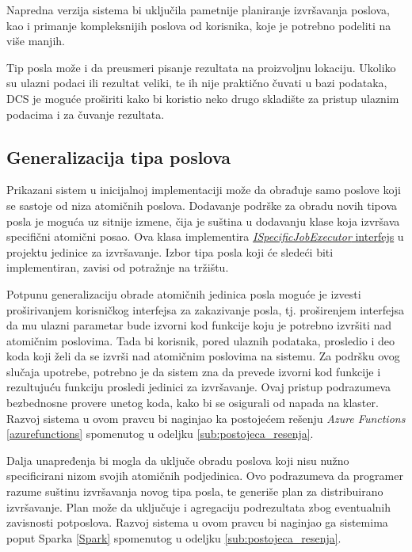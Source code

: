 \documentclass[12pt,oneside]{memoir}
\begin{document}
Napredna verzija sistema bi uključila pametnije planiranje izvršavanja poslova, kao i primanje kompleksnijih poslova od korisnika, koje je potrebno podeliti na više manjih.

Tip posla može i da preusmeri pisanje rezultata na proizvoljnu lokaciju.
Ukoliko su ulazni podaci ili rezultat veliki, te ih nije praktično čuvati u bazi podataka, DCS je moguće proširiti kako bi koristio neko drugo skladište za pristup ulaznim podacima i za čuvanje rezultata.


\subsection{Generalizacija tipa poslova}

Prikazani sistem u inicijalnoj implementaciji može da obrađuje samo poslove koji se sastoje od niza atomičnih poslova. Dodavanje podrške za obradu novih tipova posla je moguća uz sitnije izmene, čija je suština u dodavanju klase koja izvršava specifični atomični posao. Ova klasa implementira \href{https://github.com/milana-kovacevic/DistributedComputationSystem/blob/main/src/ComputeNode/Executors/ISpecificJobExecutor.cs}{\emph{ISpecificJobExecutor} interfejs} u projektu jedinice za izvršavanje. Izbor tipa posla koji će sledeći biti implementiran, zavisi od potražnje na tržištu.

Potpunu generalizaciju obrade atomičnih jedinica posla moguće je izvesti proširivanjem korisničkog interfejsa za zakazivanje posla, tj. proširenjem interfejsa da mu ulazni parametar bude izvorni kod funkcije koju je potrebno izvršiti nad atomičnim poslovima. Tada bi korisnik, pored ulaznih podataka, prosledio i deo koda koji želi da se izvrši nad atomičnim poslovima na sistemu. Za podršku ovog slučaja upotrebe, potrebno je da sistem zna da prevede izvorni kod funkcije i rezultujuću funkciju prosledi jedinici za izvršavanje. Ovaj pristup podrazumeva bezbednosne provere unetog koda, kako bi se osigurali od napada na klaster. Razvoj sistema u ovom pravcu bi naginjao ka postojećem rešenju \emph{Azure Functions} \ref{azurefunctions} spomenutog u odeljku \ref{sub:postojeca_resenja}.

Dalja unapređenja bi mogla da uključe obradu poslova koji nisu nužno specificirani nizom svojih atomičnih podjedinica. Ovo podrazumeva da programer razume suštinu izvršavanja novog tipa posla, te generiše plan za distribuirano izvršavanje. Plan može da uključuje i agregaciju podrezultata zbog eventualnih zavisnosti potposlova. Razvoj sistema u ovom pravcu bi naginjao ga sistemima poput Sparka \ref{Spark} spomenutog u odeljku \ref{sub:postojeca_resenja}.
\end{document}
